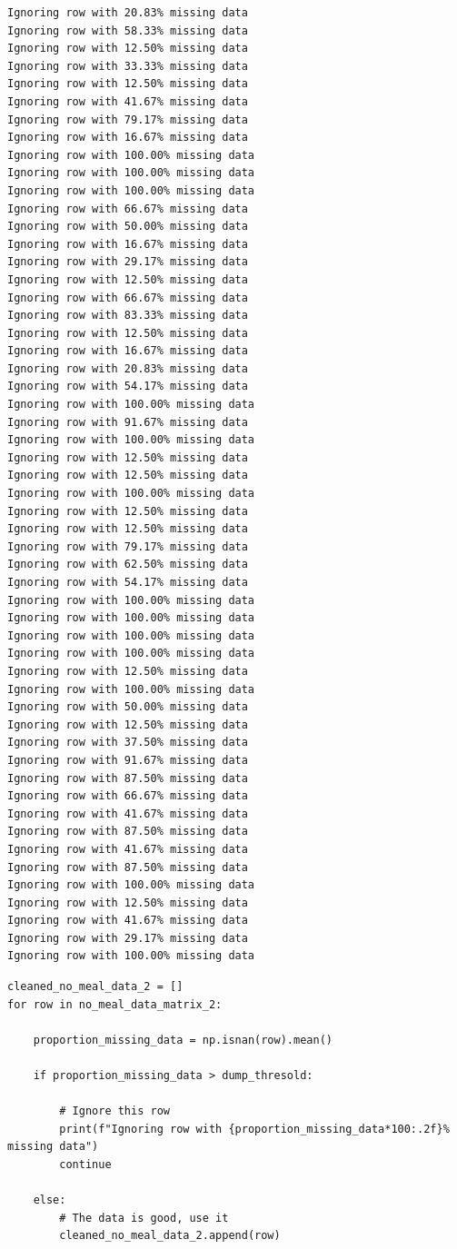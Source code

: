 \begin{verbatim}
Ignoring row with 20.83% missing data
Ignoring row with 58.33% missing data
Ignoring row with 12.50% missing data
Ignoring row with 33.33% missing data
Ignoring row with 12.50% missing data
Ignoring row with 41.67% missing data
Ignoring row with 79.17% missing data
Ignoring row with 16.67% missing data
Ignoring row with 100.00% missing data
Ignoring row with 100.00% missing data
Ignoring row with 100.00% missing data
Ignoring row with 66.67% missing data
Ignoring row with 50.00% missing data
Ignoring row with 16.67% missing data
Ignoring row with 29.17% missing data
Ignoring row with 12.50% missing data
Ignoring row with 66.67% missing data
Ignoring row with 83.33% missing data
Ignoring row with 12.50% missing data
Ignoring row with 16.67% missing data
Ignoring row with 20.83% missing data
Ignoring row with 54.17% missing data
Ignoring row with 100.00% missing data
Ignoring row with 91.67% missing data
Ignoring row with 100.00% missing data
Ignoring row with 12.50% missing data
Ignoring row with 12.50% missing data
Ignoring row with 100.00% missing data
Ignoring row with 12.50% missing data
Ignoring row with 12.50% missing data
Ignoring row with 79.17% missing data
Ignoring row with 62.50% missing data
Ignoring row with 54.17% missing data
Ignoring row with 100.00% missing data
Ignoring row with 100.00% missing data
Ignoring row with 100.00% missing data
Ignoring row with 100.00% missing data
Ignoring row with 12.50% missing data
Ignoring row with 100.00% missing data
Ignoring row with 50.00% missing data
Ignoring row with 12.50% missing data
Ignoring row with 37.50% missing data
Ignoring row with 91.67% missing data
Ignoring row with 87.50% missing data
Ignoring row with 66.67% missing data
Ignoring row with 41.67% missing data
Ignoring row with 87.50% missing data
Ignoring row with 41.67% missing data
Ignoring row with 87.50% missing data
Ignoring row with 100.00% missing data
Ignoring row with 12.50% missing data
Ignoring row with 41.67% missing data
Ignoring row with 29.17% missing data
Ignoring row with 100.00% missing data
\end{verbatim}

\begin{verbatim}
cleaned_no_meal_data_2 = []
for row in no_meal_data_matrix_2:

    proportion_missing_data = np.isnan(row).mean()

    if proportion_missing_data > dump_thresold:

        # Ignore this row
        print(f"Ignoring row with {proportion_missing_data*100:.2f}% missing data")
        continue

    else:
        # The data is good, use it
        cleaned_no_meal_data_2.append(row)
\end{verbatim}

